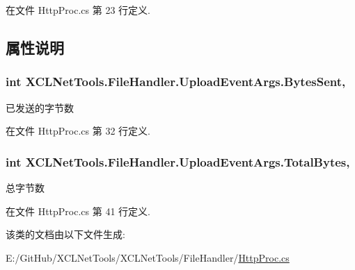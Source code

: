 在文件 Http\+Proc.\+cs 第 23 行定义.



\subsection{属性说明}
\subsubsection[{\texorpdfstring{Bytes\+Sent}{BytesSent}}]{\setlength{\rightskip}{0pt plus 5cm}int X\+C\+L\+Net\+Tools.\+File\+Handler.\+Upload\+Event\+Args.\+Bytes\+Sent\hspace{0.3cm}{\ttfamily [get]}, {\ttfamily [set]}}\hypertarget{class_x_c_l_net_tools_1_1_file_handler_1_1_upload_event_args_aeb753c87413d86d610121060635794e1}{}\label{class_x_c_l_net_tools_1_1_file_handler_1_1_upload_event_args_aeb753c87413d86d610121060635794e1}


已发送的字节数 



在文件 Http\+Proc.\+cs 第 32 行定义.

\subsubsection[{\texorpdfstring{Total\+Bytes}{TotalBytes}}]{\setlength{\rightskip}{0pt plus 5cm}int X\+C\+L\+Net\+Tools.\+File\+Handler.\+Upload\+Event\+Args.\+Total\+Bytes\hspace{0.3cm}{\ttfamily [get]}, {\ttfamily [set]}}\hypertarget{class_x_c_l_net_tools_1_1_file_handler_1_1_upload_event_args_a874a8bc16016a3d11eb9aa52f9670eb4}{}\label{class_x_c_l_net_tools_1_1_file_handler_1_1_upload_event_args_a874a8bc16016a3d11eb9aa52f9670eb4}


总字节数 



在文件 Http\+Proc.\+cs 第 41 行定义.



该类的文档由以下文件生成\+:\begin{DoxyCompactItemize}
\item 
E\+:/\+Git\+Hub/\+X\+C\+L\+Net\+Tools/\+X\+C\+L\+Net\+Tools/\+File\+Handler/\hyperlink{_http_proc_8cs}{Http\+Proc.\+cs}\end{DoxyCompactItemize}
